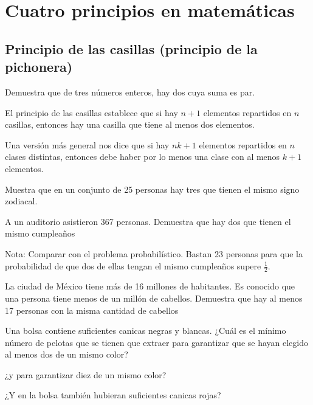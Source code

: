 \chapter{Cuatro principios en matemáticas}

\section{Principio de las casillas (principio de la pichonera)}

\begin{ejercicio}
Demuestra que de tres números enteros, hay dos cuya suma es par.
\end{ejercicio}
\vspace{2cm}

El principio de las casillas establece que si hay $n+1$ elementos repartidos en $n$ casillas, entonces hay una casilla que tiene al menos dos elementos.

Una versión más general nos dice que si hay $nk+1$ elementos repartidos en $n$ clases distintas, entonces debe haber por lo menos una clase con al menos $k+1$ elementos.

\begin{ejercicio}
Muestra que en un conjunto de 25 personas hay tres que tienen el mismo signo zodiacal.
\end{ejercicio}
\vspace{2cm}

\begin{ejercicio}
A un auditorio asistieron 367 personas. Demuestra que hay dos que tienen el mismo cumpleaños
\end{ejercicio}
\vspace{2cm}

Nota: Comparar con el problema probabilístico. Bastan 23 personas para que la probabilidad de que dos de ellas tengan el mismo cumpleaños supere $\frac{1}{2}$.

\begin{ejercicio}
La ciudad de México tiene más de 16 millones de habitantes. Es conocido que una persona tiene menos de un millón de cabellos. Demuestra que hay al menos 17 personas con la misma cantidad de cabellos 
\end{ejercicio}
\vspace{2cm}

\begin{ejercicio}
Una bolsa contiene suficientes canicas negras y blancas. ¿Cuál es el mínimo número de pelotas que se tienen que extraer para garantizar que se hayan elegido al menos dos de un mismo color?

¿y para garantizar diez de un mismo color?

¿Y en la bolsa también hubieran suficientes canicas rojas?
\end{ejercicio}
\vspace{2cm}

